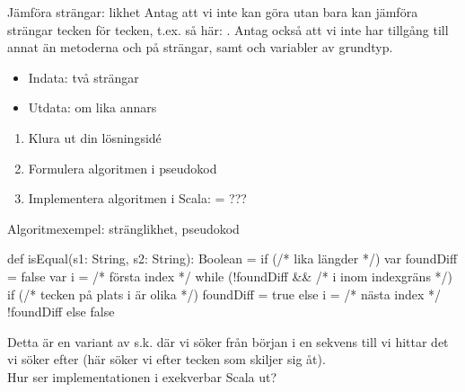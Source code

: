 \begin{Slide}{Jämföra strängar: likhet}\SlideFontSmall
Antag att vi inte kan göra  utan bara kan jämföra strängar tecken för tecken, 
t.ex. så här: . Antag också att vi inte har tillgång till annat än metoderna  och  på strängar, samt   och variabler av grundtyp. 

\pause
\begin{itemize}
\item Indata: två strängar
\item Utdata:  om lika annars 
\end{itemize}
\begin{enumerate}
\item Klura ut din lösningsidé
\item Formulera algoritmen i pseudokod
\item Implementera algoritmen i Scala:  = ???
\end{enumerate}
\end{Slide}

\begin{Slide}{Algoritmexempel: stränglikhet, pseudokod}
\begin{Code}
def isEqual(s1: String, s2: String): Boolean = {
  if (/* lika längder */) {
    var foundDiff = false
    var i = /* första index */
    while (!foundDiff && /* i inom indexgräns */) {
      if (/* tecken på plats i är olika */) foundDiff = true
      else i = /* nästa index */
    }
    !foundDiff
  } else false
}
\end{Code}

\pause Detta är en variant av s.k.  där vi söker från början i en sekvens till vi hittar det vi söker efter (här söker vi efter tecken som skiljer sig åt). 
\\\pause\vspace{2.5em} Hur ser implementationen i exekverbar Scala ut?
\end{Slide}

